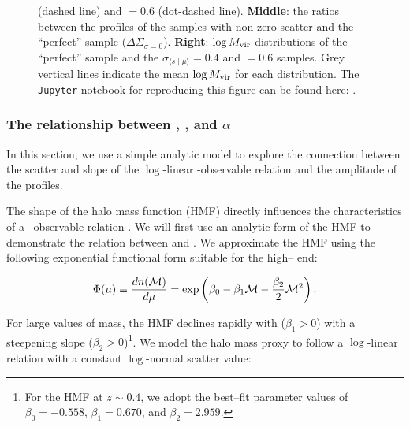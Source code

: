 \documentclass[fleqn,usenatbib,useAMS]{mnras}
\begin{document}
\begin{CJK*}{UTF8}{gbsn}
\begin{figure}
{        (dashed line) and $=0.6$ (dot-dashed line).
        \textbf{Middle}: the ratios between the \dsigma{} profiles of the \topn{} samples with
        non-zero scatter and the ``perfect'' sample ($\Delta\Sigma_{\sigma=0}$). 
        \textbf{Right}: $\log M_{\rm vir}$ distributions of the ``perfect'' \topn{} sample and
        the $\sigma_{\langle s \mid \mu\rangle}=0.4$ and $=0.6$ samples. 
        Grey vertical lines indicate the mean $\log M_{\rm vir}$ for each distribution.
        The \texttt{Jupyter} notebook for reproducing this figure can be found here:
        \href{https://github.com/dr-guangtou/jianbing/blob/master/notebooks/figure/fig2.ipynb}{\faGithub}.
    }
    \label{fig:mdpl2}
\end{figure}

\subsubsection{The relationship between \scatterMhaloObsSym{}, \scatterObsSymMhalo{}, and $\alpha$}
    \label{sec:comp_scatters}

    In this section, we use a simple analytic model to explore the connection between the scatter
    and slope of the $\log$-linear \mvir{}-observable relation and the amplitude of the \dsigma{}
    profiles.
    
    The shape of the halo mass function (HMF) directly influences the characteristics of a
    \mvir{}--observable relation \citep[\eg{}][]{Tinker2008}.
    We will first use an analytic form of the HMF to demonstrate the relation between 
    \scatterMhaloObsSym{} and \scatterObsSymMhalo{}.
    We approximate the HMF using the following exponential functional form suitable for the 
    high--\mvir{} end:

    \begin{equation}
        \Phi(\mu){} \equiv \frac{dn({\mathcal{M}}{})}{d\mu{}}  = \exp \left(\beta_0 - \beta_1 {\mathcal{M}}{} - \frac{\beta_2}{2}
        {\mathcal{M}}{}^2 \right).
        \label{eq:quadratic_hmf}
    \end{equation}

    \noindent For large values of mass, the HMF declines rapidly with \mhalo{} ($\beta_1 > 0$) with
    a steepening slope ($\beta_2 > 0$)\footnote{For the  HMF at $z\sim 0.4$, we adopt the 
    best--fit parameter values of $\beta_{0}=-0.558$, $\beta_{1}=0.670$, and $\beta_{2}=2.959$.}. 
    We model the halo mass proxy \obsSym to follow a $\log$-linear relation with a constant
    $\log$-normal scatter value:


\end{CJK*}
\end{document}
